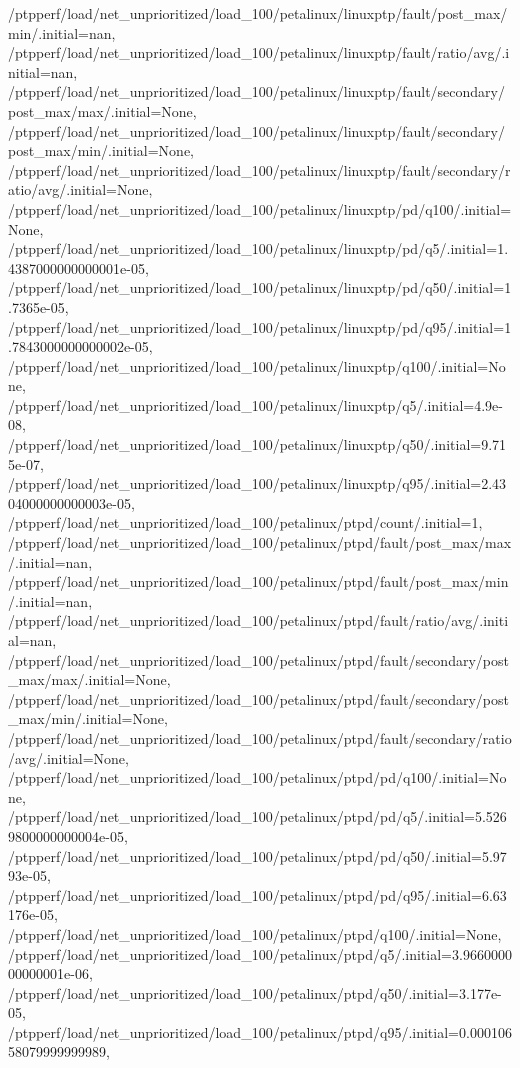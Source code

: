 {    /ptpperf/load/net_unprioritized/load_100/petalinux/linuxptp/fault/post_max/min/.initial=nan,
    /ptpperf/load/net_unprioritized/load_100/petalinux/linuxptp/fault/ratio/avg/.initial=nan,
    /ptpperf/load/net_unprioritized/load_100/petalinux/linuxptp/fault/secondary/post_max/max/.initial=None,
    /ptpperf/load/net_unprioritized/load_100/petalinux/linuxptp/fault/secondary/post_max/min/.initial=None,
    /ptpperf/load/net_unprioritized/load_100/petalinux/linuxptp/fault/secondary/ratio/avg/.initial=None,
    /ptpperf/load/net_unprioritized/load_100/petalinux/linuxptp/pd/q100/.initial=None,
    /ptpperf/load/net_unprioritized/load_100/petalinux/linuxptp/pd/q5/.initial=1.4387000000000001e-05,
    /ptpperf/load/net_unprioritized/load_100/petalinux/linuxptp/pd/q50/.initial=1.7365e-05,
    /ptpperf/load/net_unprioritized/load_100/petalinux/linuxptp/pd/q95/.initial=1.7843000000000002e-05,
    /ptpperf/load/net_unprioritized/load_100/petalinux/linuxptp/q100/.initial=None,
    /ptpperf/load/net_unprioritized/load_100/petalinux/linuxptp/q5/.initial=4.9e-08,
    /ptpperf/load/net_unprioritized/load_100/petalinux/linuxptp/q50/.initial=9.715e-07,
    /ptpperf/load/net_unprioritized/load_100/petalinux/linuxptp/q95/.initial=2.4304000000000003e-05,
    /ptpperf/load/net_unprioritized/load_100/petalinux/ptpd/count/.initial=1,
    /ptpperf/load/net_unprioritized/load_100/petalinux/ptpd/fault/post_max/max/.initial=nan,
    /ptpperf/load/net_unprioritized/load_100/petalinux/ptpd/fault/post_max/min/.initial=nan,
    /ptpperf/load/net_unprioritized/load_100/petalinux/ptpd/fault/ratio/avg/.initial=nan,
    /ptpperf/load/net_unprioritized/load_100/petalinux/ptpd/fault/secondary/post_max/max/.initial=None,
    /ptpperf/load/net_unprioritized/load_100/petalinux/ptpd/fault/secondary/post_max/min/.initial=None,
    /ptpperf/load/net_unprioritized/load_100/petalinux/ptpd/fault/secondary/ratio/avg/.initial=None,
    /ptpperf/load/net_unprioritized/load_100/petalinux/ptpd/pd/q100/.initial=None,
    /ptpperf/load/net_unprioritized/load_100/petalinux/ptpd/pd/q5/.initial=5.5269800000000004e-05,
    /ptpperf/load/net_unprioritized/load_100/petalinux/ptpd/pd/q50/.initial=5.9793e-05,
    /ptpperf/load/net_unprioritized/load_100/petalinux/ptpd/pd/q95/.initial=6.63176e-05,
    /ptpperf/load/net_unprioritized/load_100/petalinux/ptpd/q100/.initial=None,
    /ptpperf/load/net_unprioritized/load_100/petalinux/ptpd/q5/.initial=3.966000000000001e-06,
    /ptpperf/load/net_unprioritized/load_100/petalinux/ptpd/q50/.initial=3.177e-05,
    /ptpperf/load/net_unprioritized/load_100/petalinux/ptpd/q95/.initial=0.00010658079999999989,
}
